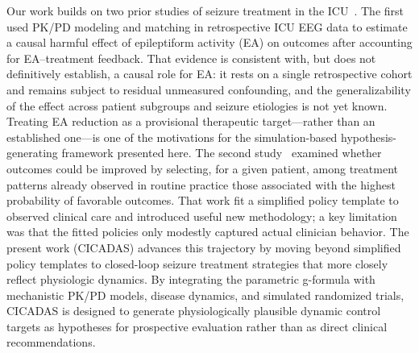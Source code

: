 Our work builds on two prior studies of seizure treatment in the ICU~\cite{parikh2023effects, parikh2024safe}. The first~\cite{parikh2023effects} used PK/PD modeling and matching in retrospective ICU EEG data to estimate a causal harmful effect of epileptiform activity (EA) on outcomes after accounting for EA--treatment feedback. That evidence is consistent with, but does not definitively establish, a causal role for EA: it rests on a single retrospective cohort and remains subject to residual unmeasured confounding, and the generalizability of the effect across patient subgroups and seizure etiologies is not yet known. Treating EA reduction as a provisional therapeutic target---rather than an established one---is one of the motivations for the simulation-based hypothesis-generating framework presented here. The second study~\cite{parikh2024safe} examined whether outcomes could be improved by selecting, for a given patient, among treatment patterns already observed in routine practice those associated with the highest probability of favorable outcomes. That work fit a simplified policy template to observed clinical care and introduced useful new methodology; a key limitation was that the fitted policies only modestly captured actual clinician behavior. The present work (CICADAS) advances this trajectory by moving beyond simplified policy templates to closed-loop seizure treatment strategies that more closely reflect physiologic dynamics. By integrating the parametric g-formula with mechanistic PK/PD models, disease dynamics, and simulated randomized trials, CICADAS is designed to generate physiologically plausible dynamic control targets as hypotheses for prospective evaluation rather than as direct clinical recommendations.

